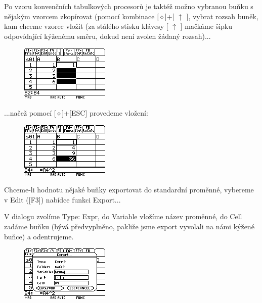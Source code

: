 \documentclass[10pt,a4paper,float]{article}
\begin{document}
Po vzoru konvenčních tabulkových procesorů je taktéž možno vybranou buňku s nějakým vzorcem zkopírovat (pomocí kombinace [$\diamond$]+[ $\uparrow$ ], vybrat rozsah buněk, kam chceme vzorec vložit (za stálého stisku klávesy [ $\uparrow$ ] mačkáme šipku odpovídající kýženému směru, dokud není zvolen žádaný rozsah)...

\begin{figure}[H]
	\centering
	\includegraphics[width=.5\textwidth]{img/CELL3}
\end{figure}

...načež pomocí [$\diamond$]+[ESC] provedeme vložení:

\begin{figure}[H]
	\centering
	\includegraphics[width=.5\textwidth]{img/CELL4}
\end{figure}

Chceme-li hodnotu nějaké buňky exportovat do standardní proměnné, vybereme v Edit ([F3]) nabídce funkci Export...

\pagebreak

V dialogu zvolíme Type: Expr, do Variable vložíme název proměnné, do Cell zadáme buňku (bývá předvyplněno, pakliže jsme export vyvolali na námi kýžené buňce) a odentrujeme.

\begin{figure}[H]
	\centering
	\includegraphics[width=.5\textwidth]{img/CELL5}
\end{figure}
\end{document}
